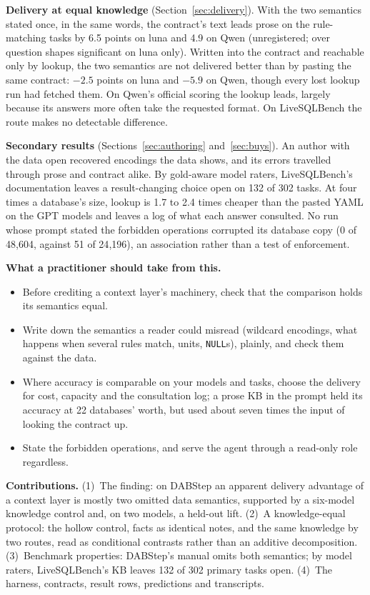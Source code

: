 \textbf{Delivery at equal knowledge} (Section~\ref{sec:delivery}). With the
two semantics stated once, in the same words, the contract's text leads
prose on the rule-matching tasks by 6.5 points on luna and 4.9 on Qwen
(unregistered; over question shapes significant on luna only). Written
into the contract and reachable only by lookup, the two semantics are not
delivered better than by pasting the same contract: $-2.5$ points on luna
and $-5.9$ on Qwen, though every lost lookup run had fetched them. On
Qwen's official scoring the lookup leads, largely because its answers more
often take the requested format. On LiveSQLBench the route makes no
detectable difference.

\textbf{Secondary results} (Sections~\ref{sec:authoring}
and~\ref{sec:buys}). An author with the data open recovered encodings the
data shows, and its errors travelled through prose and contract alike. By
gold-aware model raters, LiveSQLBench's documentation leaves a
result-changing choice open on 132 of 302 tasks. At four times a
database's size, lookup is 1.7 to 2.4 times cheaper than the pasted YAML
on the GPT models and leaves a log of what each answer consulted. No run
whose prompt stated the forbidden operations corrupted its database copy
(0 of 48{,}604, against 51 of 24{,}196), an association rather than a test
of enforcement.

\textbf{What a practitioner should take from this.}
\begin{itemize}
\itemsep0pt
\item Before crediting a context layer's machinery, check that the
      comparison holds its semantics equal.
\item Write down the semantics a reader could misread (wildcard encodings,
      what happens when several rules match, units, \texttt{NULL}s), plainly,
      and check them against the data.
\item Where accuracy is comparable on your models and tasks, choose the
      delivery for cost, capacity and the consultation log; a prose KB in
      the prompt held its accuracy at 22 databases' worth, but used about
      seven times the input of looking the contract up.
\item State the forbidden operations, and serve the agent through a
      read-only role regardless.
\end{itemize}

\textbf{Contributions.} (1)~The finding: on DABStep an apparent delivery
advantage of a context layer is mostly two omitted data semantics,
supported by a six-model knowledge control and, on two models, a held-out
lift. (2)~A knowledge-equal protocol: the hollow control, facts as
identical notes, and the same knowledge by two routes, read as conditional
contrasts rather than an additive decomposition. (3)~Benchmark properties:
DABStep's manual omits both semantics; by model raters, LiveSQLBench's KB
leaves 132 of 302 primary tasks open. (4)~The harness, contracts, result
rows, predictions and transcripts.
